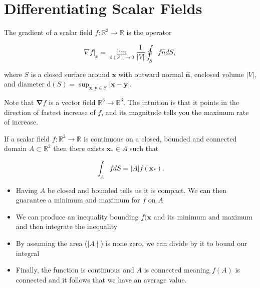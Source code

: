 \section{Differentiating Scalar Fields}

\begin{definition}
  The gradient of a scalar field \(f: \mathbb{R}^3 \rightarrow \mathbb{R}\) is the operator

\[
\left.\nabla f\right|_x=\lim _{\mathrm{d}(S) \rightarrow 0} \frac{1}{|V|} \oint_S f \hat{n} d S,
\]

where \(S\) is a closed surface around \(\boldsymbol{x}\) with outward normal \(\hat{\boldsymbol{n}}\), enclosed volume \(|V|\), and diameter \(\mathrm{d}(S)=\sup _{\boldsymbol{x}, \boldsymbol{y} \in S}|\boldsymbol{x}-\boldsymbol{y}|\).
\end{definition}

\begin{remark}
  Note that \(\boldsymbol{\nabla} f\) is a vector field \(\mathbb{R}^3 \rightarrow \mathbb{R}^3\). The intuition is that it points in the direction of fastest increase of \(f\), and its magnitude tells you the maximum rate of increase.
\end{remark}

\begin{lemma}
  If a scalar field \(f: \mathbb{R}^2 \rightarrow \mathbb{R}\) is continuous on a closed, bounded and connected domain \(A \subset \mathbb{R}^2\) then there exists \(\boldsymbol{x}_* \in A\) such that

\[
\int_A f d S=|A| f\left(\boldsymbol{x}_*\right) .
\]
\end{lemma}

\begin{proofidea}

  \begin{itemize}
    \item   Having \(A\) be closed and bounded tells us it is compact. We can then guarantee a minimum and maximum for \(f\) on \(A\)
    \item We can produce an inequality bounding \(f(\mathbf{x}\) and its minimum and maximum and then integrate the inequality
    \item By assuming the area (\(\mid A \mid \)) is none zero, we can divide by it to bound our integral
    \item Finally, the function is continuous and \(A\) is connected meaning \(f(A)\) is connected and it follows that we have an average value.
  \end{itemize}
 
  \end{proofidea}

